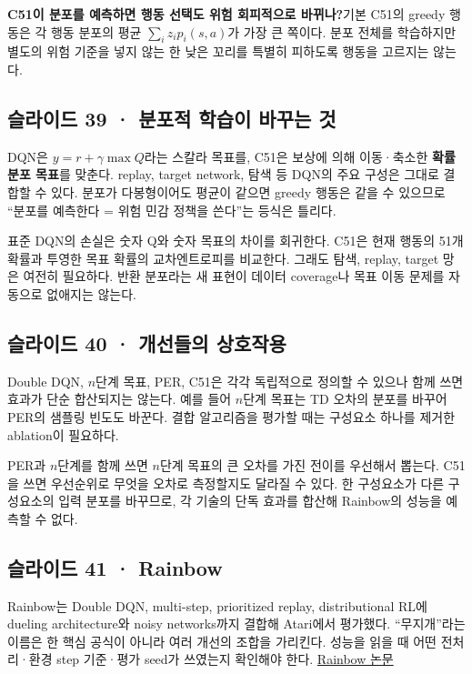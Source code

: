 \documentclass[11pt,a4paper]{article}
\begin{document}
\par\medskip\noindent\textbf{C51이 분포를 예측하면 행동 선택도 위험 회피적으로 바뀌나?}\quad 기본 C51의 greedy 행동은 각 행동 분포의 평균 $\sum_i z_i p_i(s,a)$가 가장 큰 쪽이다. 분포 전체를 학습하지만 별도의 위험 기준을 넣지 않는 한 낮은 꼬리를 특별히 피하도록 행동을 고르지는 않는다.\par

\subsection{슬라이드 39 · 분포적 학습이 바꾸는 것}

DQN은 $y=r+\gamma\max Q$라는 스칼라 목표를, C51은 보상에 의해 이동·축소한 \textbf{확률 분포 목표}를 맞춘다. replay, target network, 탐색 등 DQN의 주요 구성은 그대로 결합할 수 있다. 분포가 다봉형이어도 평균이 같으면 greedy 행동은 같을 수 있으므로 “분포를 예측한다 = 위험 민감 정책을 쓴다”는 등식은 틀리다.\par

표준 DQN의 손실은 숫자 Q와 숫자 목표의 차이를 회귀한다. C51은 현재 행동의 51개 확률과 투영한 목표 확률의 교차엔트로피를 비교한다. 그래도 탐색, replay, target 망은 여전히 필요하다. 반환 분포라는 새 표현이 데이터 coverage나 목표 이동 문제를 자동으로 없애지는 않는다.\par

\subsection{슬라이드 40 · 개선들의 상호작용}

Double DQN, $n$단계 목표, PER, C51은 각각 독립적으로 정의할 수 있으나 함께 쓰면 효과가 단순 합산되지는 않는다. 예를 들어 $n$단계 목표는 TD 오차의 분포를 바꾸어 PER의 샘플링 빈도도 바꾼다. 결합 알고리즘을 평가할 때는 구성요소 하나를 제거한 ablation이 필요하다.\par

PER과 $n$단계를 함께 쓰면 $n$단계 목표의 큰 오차를 가진 전이를 우선해서 뽑는다. C51을 쓰면 우선순위로 무엇을 오차로 측정할지도 달라질 수 있다. 한 구성요소가 다른 구성요소의 입력 분포를 바꾸므로, 각 기술의 단독 효과를 합산해 Rainbow의 성능을 예측할 수 없다.\par

\subsection{슬라이드 41 · Rainbow}

Rainbow는 Double DQN, multi-step, prioritized replay, distributional RL에 dueling architecture와 noisy networks까지 결합해 Atari에서 평가했다. “무지개”라는 이름은 한 핵심 공식이 아니라 여러 개선의 조합을 가리킨다. 성능을 읽을 때 어떤 전처리·환경 step 기준·평가 seed가 쓰였는지 확인해야 한다. \href{https://arxiv.org/abs/1710.02298}{Rainbow 논문}\par
\end{document}

